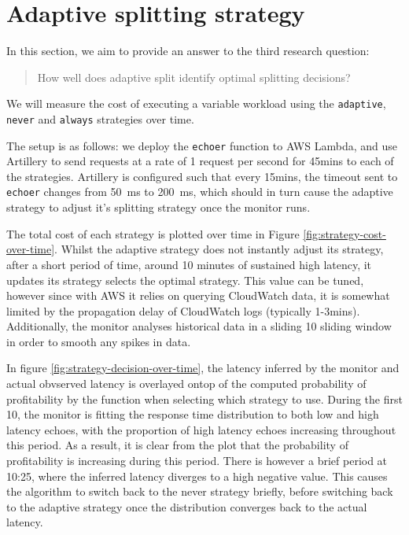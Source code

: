 \section{Adaptive splitting strategy}
In this section, we aim to provide an answer to the third research question: \blockquote{How well does adaptive split identify optimal splitting decisions?} We will measure the cost of executing a variable workload using the \verb|adaptive|, \verb|never| and \verb|always| strategies over time.

The setup is as follows: we deploy the \verb|echoer| function to AWS Lambda, and use Artillery\cite{artilleryArtilleryCloudscaleLoad} to send requests at a rate of 1 request per second for 45mins to each of the strategies. Artillery is configured such that every 15mins, the timeout sent to \verb|echoer| changes from \SI{50}{\milli\second} to \SI{200}{\milli\second}, which should in turn cause the adaptive strategy to adjust it's splitting strategy once the monitor runs.

The total cost of each strategy is plotted over time in Figure \ref{fig:strategy-cost-over-time}. Whilst the adaptive strategy does not instantly adjust its strategy, after a short period of time, around 10 minutes of sustained high latency, it updates its strategy selects the optimal strategy. This value can be tuned, however since with AWS it relies on querying CloudWatch data, it is somewhat limited by the propagation delay of CloudWatch logs (typically 1-3mins). Additionally, the monitor analyses historical data in a sliding \SI{10}{\min} sliding window in order to smooth any spikes in data.

\begin{figure*}
    \begin{center}
        
    \end{center}
    \caption{Cost over time when applying the adaptive splitting strategy to the echoer program in the benchmark suite, applying high latency during the experiment to evaluate how the strategy switches based on response times.}
    \label{fig:strategy-cost-over-time}
\end{figure*}

In figure \ref{fig:strategy-decision-over-time}, the latency inferred by the monitor and actual obvserved latency is overlayed ontop of the computed probability of profitability by the function when selecting which strategy to use. During the first \SI{10}{\min}, the monitor is fitting the response time distribution to both low and high latency echoes, with the proportion of high latency echoes increasing throughout this period. As a result, it is clear from the plot that the probability of profitability is increasing during this period. There is however a brief period at 10:25, where the inferred latency diverges to a high negative value. This causes the algorithm to switch back to the never strategy briefly, before switching back to the adaptive strategy once the distribution converges back to the actual latency.

